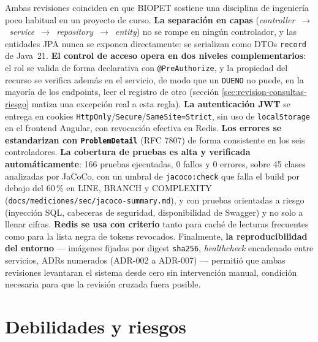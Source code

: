 Ambas revisiones coinciden en que BIOPET sostiene una disciplina de
ingenier\'ia poco habitual en un proyecto de curso. \textbf{La separaci\'on
en capas} (\emph{controller~$\to$~service~$\to$~repository~$\to$~entity}) no
se rompe en ning\'un controlador, y las entidades JPA nunca se exponen
directamente: se serializan como DTOs \texttt{record} de Java~21. \textbf{El
control de acceso opera en dos niveles complementarios}: el rol se valida de
forma declarativa con \texttt{@PreAuthorize}, y la propiedad del recurso se
verifica adem\'as en el servicio, de modo que un \texttt{DUENO} no puede, en
la mayor\'ia de los endpoints, leer el registro de otro (secci\'on
\ref{sec:revision-consultas-riesgo} matiza una excepci\'on real a esta
regla). \textbf{La autenticaci\'on JWT} se entrega en cookies
\texttt{HttpOnly}/\texttt{Secure}/\texttt{SameSite=Strict}, sin uso de
\texttt{localStorage} en el frontend Angular, con revocaci\'on efectiva en
Redis. \textbf{Los errores se estandarizan con \texttt{ProblemDetail}} (RFC
7807) de forma consistente en los seis controladores. \textbf{La cobertura
de pruebas es alta y verificada autom\'aticamente}: 166 pruebas ejecutadas,
0 fallos y 0 errores, sobre 45 clases analizadas por JaCoCo, con un umbral
de \texttt{jacoco:check} que falla el build por debajo del 60\,\% en LINE,
BRANCH y COMPLEXITY (\texttt{docs/mediciones/sec/jacoco-summary.md}), y con
pruebas orientadas a riesgo (inyecci\'on SQL, cabeceras de seguridad,
disponibilidad de Swagger) y no solo a llenar cifras. \textbf{Redis se usa
con criterio} tanto para cach\'e de lecturas frecuentes como para la lista
negra de tokens revocados. Finalmente, \textbf{la reproducibilidad del
entorno} --- im\'agenes fijadas por digest \texttt{sha256}, \emph{healthcheck}
encadenado entre servicios, ADRs numerados (ADR-002 a ADR-007) --- permiti\'o
que ambas revisiones levantaran el sistema desde cero sin intervenci\'on
manual, condici\'on necesaria para que la revisi\'on cruzada fuera posible.

\section{Debilidades y riesgos}
\label{sec:revision-debilidades}

